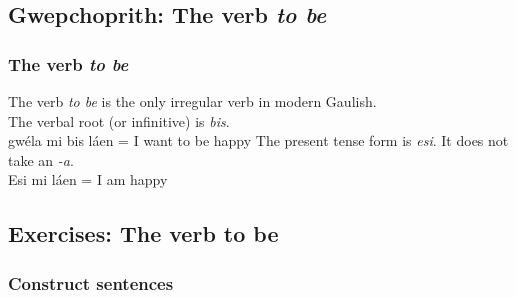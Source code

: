 \subsection{Gwepchoprith: The verb \textit{to be}}
\subsubsection{The verb \textit{to be}}
The verb \textit{to be} is the only irregular verb in modern Gaulish.\\
The verbal root (or infinitive) is \textit{bis}.\\
gw\'{e}la mi bis l\'{a}en = I want to be happy
The present tense form is \textit{esi}. It does not take an \textit{-a}.\\
Esi mi l\'{a}en = I am happy

\newpage
\subsection{Exercises: The verb to be}

\subsubsection{Construct sentences}

